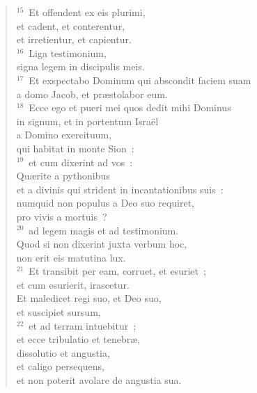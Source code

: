 \begin{flushleft}
\begin{verse}
${}^{15}$~Et offendent ex eis plurimi,\\ et cadent, et conterentur,\\ et irretientur, et capientur.\\
${}^{16}$~Liga testimonium,\\ signa legem in discipulis meis.\\
${}^{17}$~Et exspectabo Dominum qui abscondit faciem suam\\ a domo Jacob, et pr\ae stolabor eum.\\
${}^{18}$~Ecce ego et pueri mei quos dedit mihi Dominus\\ in signum, et in portentum Isra\"el\\ a Domino exercituum,\\ qui habitat in monte Sion~:\\
${}^{19}$~et cum dixerint ad vos~:\\ Qu\ae rite a pythonibus\\ et a divinis qui strident in incantationibus suis~:\\ numquid non populus a Deo suo requiret,\\ pro vivis a mortuis~?\\
${}^{20}$~ad legem magis et ad testimonium.\\ Quod si non dixerint juxta verbum hoc,\\ non erit eis matutina lux.\\
${}^{21}$~Et transibit per eam, corruet, et esuriet~;\\ et cum esurierit, irascetur.\\ Et maledicet regi suo, et Deo suo,\\ et suscipiet sursum,\\
${}^{22}$~et ad terram intuebitur~;\\ et ecce tribulatio et tenebr\ae ,\\ dissolutio et angustia,\\ et caligo persequens,\\ et non poterit avolare de angustia sua.\end{verse}\end{flushleft}


